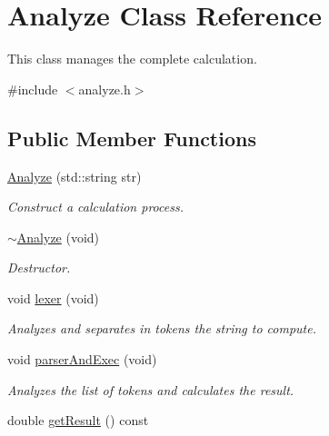 \hypertarget{class_analyze}{\section{Analyze Class Reference}
\label{class_analyze}
}


This class manages the complete calculation.  




{\ttfamily \#include $<$analyze.\-h$>$}

\subsection*{Public Member Functions}
\begin{DoxyCompactItemize}
\item 
\hyperlink{class_analyze_a12151b9c257f0d9c3cb29c9437a2e2fe}{Analyze} (std\-::string str)
\begin{DoxyCompactList}\small\item\em Construct a calculation process. \end{DoxyCompactList}\item 
\hypertarget{class_analyze_a7e2d7d56afe79f627f494489b500a2ae}{\hyperlink{class_analyze_a7e2d7d56afe79f627f494489b500a2ae}{$\sim$\-Analyze} (void)}\label{class_analyze_a7e2d7d56afe79f627f494489b500a2ae}

\begin{DoxyCompactList}\small\item\em Destructor. \end{DoxyCompactList}\item 
\hypertarget{class_analyze_a1090a6b9655c4770707d65ee8ebc124a}{void \hyperlink{class_analyze_a1090a6b9655c4770707d65ee8ebc124a}{lexer} (void)}\label{class_analyze_a1090a6b9655c4770707d65ee8ebc124a}

\begin{DoxyCompactList}\small\item\em Analyzes and separates in tokens the string to compute. \end{DoxyCompactList}\item 
\hypertarget{class_analyze_aa07a4a854c10eec4f7e79bc3671dfcf8}{void \hyperlink{class_analyze_aa07a4a854c10eec4f7e79bc3671dfcf8}{parser\-And\-Exec} (void)}\label{class_analyze_aa07a4a854c10eec4f7e79bc3671dfcf8}

\begin{DoxyCompactList}\small\item\em Analyzes the list of tokens and calculates the result. \end{DoxyCompactList}\item 
\hypertarget{class_analyze_a8bc8ac0d37292d3083966c4a6bd8b13b}{double \hyperlink{class_analyze_a8bc8ac0d37292d3083966c4a6bd8b13b}{get\-Result} () const }\label{class_analyze_a8bc8ac0d37292d3083966c4a6bd8b13b}


\end{DoxyCompactItemize}
